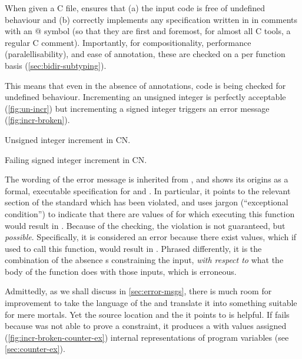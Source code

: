 When given a C file,  ensures that (a) the input code is free of
undefined behaviour and (b) correctly implements any specification written in
 in comments with an @ symbol 
(so that they are first and foremost, for almost all C tools, a regular C
comment). Importantly, for compositionality, performance (paralellisability),
and ease of annotation, these are checked on a per function basis (\cref{sec:bidir-subtyping}).

This means that even in the absence of annotations, code is being checked for
undefined behaviour. Incrementing an unsigned integer is perfectly acceptable
(\cref{fig:un-incr}) but incrementing a signed integer triggers an error message
(\cref{fig:incr-broken}).

\begin{marginfigure}
    \centering
    \caption{Unsigned integer increment in CN.}\label{fig:un-incr}
\end{marginfigure}%

\begin{marginfigure}
    \centering
    \caption{Failing signed integer increment in CN.}\label{fig:incr-broken}
\end{marginfigure}%

The wording of the error message is inherited from , and shows its
origins as a formal, executable specification for  and 
. In particular, it points to the relevant section of the standard which
has been violated, and uses jargon (``exceptional condition'') to indicate that
there are values of  for which executing this function would result
in . Because of the  checking, the violation is not
guaranteed, but \emph{possible}. Specifically, it is considered an error
because there exist values, which if used to call this function, would result
in . Phrased differently, it is the combination of the absence
s constraining the input, \emph{with respect to} what the body
of the function does with those inputs, which is erroneous.

Admittedly, as we shall discuss in \cref{sec:error-msgs}, there is much room
for improvement to take the language of the  and
translate it into something suitable for mere mortals. Yet the source location
and the  it points to is helpful. If  fails
because  was not able to prove a constraint, it produces a
 with values assigned (\cref{fig:incr-broken-counter-ex})
internal representations of program variables (see \cref{sec:counter-ex}).

